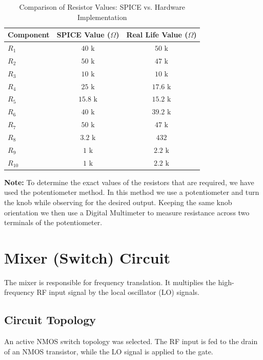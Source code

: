 \documentclass[conference]{IEEEtran}
\begin{document}
\begin{table}[H]
    \centering
    \caption{Comparison of Resistor Values: SPICE vs. Hardware Implementation}
    \renewcommand{\arraystretch}{1.2}
    \begin{tabular}{@{}lcc@{}}
        \toprule
        \textbf{Component} & \textbf{SPICE Value ($\Omega$)} & \textbf{Real Life Value ($\Omega$)} \\ \midrule
        $R_1$ & $40\text{ k}$ & $50\text{ k}$ \\
        $R_2$ & $50\text{ k}$ & $47\text{ k}$ \\
        $R_3$ & $10\text{ k}$ & $10\text{ k}$ \\
        $R_4$ & $25\text{ k}$ & $17.6\text{ k}$ \\
        $R_5$ & $15.8\text{ k}$ & $15.2\text{ k}$ \\
        $R_6$ & $40\text{ k}$ & $39.2\text{ k}$ \\
        $R_7$ & $50\text{ k}$ & $47\text{ k}$ \\
        $R_8$ & $3.2\text{ k}$ & $432$ \\
        $R_9$ & $1\text{ k}$ & $2.2\text{ k}$ \\
        $R_{10}$ & $1\text{ k}$ & $2.2\text{ k}$ \\ \bottomrule
    \end{tabular}
    \label{tab:resistor_comparison}
\end{table}

\textbf{Note:} To determine the exact values of the resistors that are required, we have used the potentiometer method. In this method we use a potentiometer and turn the knob while observing for the desired output. Keeping the same knob orientation we then use a Digital Multimeter to measure resistance across two terminals of the potentiometer.



\section{Mixer (Switch) Circuit}
The mixer is responsible for frequency translation. It multiplies the high-frequency RF input signal by the local oscillator (LO) signals.

\subsection{Circuit Topology}
An active NMOS switch topology was selected. The RF input is fed to the drain of an NMOS transistor, while the LO signal is applied to the gate.
\end{document}
